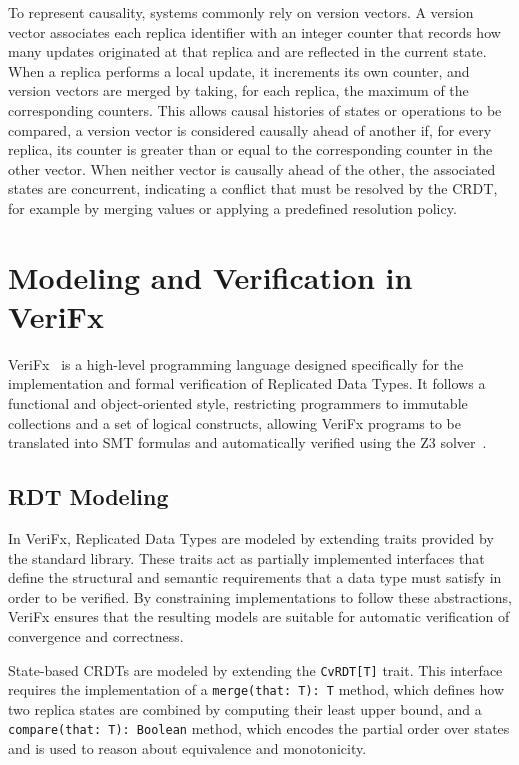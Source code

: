 To represent causality, systems commonly rely on version vectors. A version vector associates each replica identifier with an integer counter that records how many updates originated at that replica and are reflected in the current state. When a replica performs a local update, it increments its own counter, and version vectors are merged by taking, for each replica, the maximum of the corresponding counters. This allows causal histories of states or operations to be compared, a version vector is considered causally ahead of another if, for every replica, its counter is greater than or equal to the corresponding counter in the other vector. When neither vector is causally ahead of the other, the associated states are concurrent, indicating a conflict that must be resolved by the CRDT, for example by merging values or applying a predefined resolution policy.

\section{Modeling and Verification in VeriFx}
\label{sec:verifx}

VeriFx~\cite{porre2023masses} is a high-level programming language designed specifically for the implementation and formal verification of Replicated Data Types. It follows a functional and object-oriented style, restricting programmers to immutable collections and a set of logical constructs, allowing VeriFx programs to be translated into SMT formulas and automatically verified using the Z3 solver~\cite{z3}.

\subsection{RDT Modeling}
\label{sub:modeling}

In VeriFx, Replicated Data Types are modeled by extending traits provided by the standard library. These traits act as partially implemented interfaces that define the structural and semantic requirements that a data type must satisfy in order to be verified. By constraining implementations to follow these abstractions, VeriFx ensures that the resulting models are suitable for automatic verification of convergence and correctness.

State-based CRDTs are modeled by extending the \texttt{CvRDT[T]} trait. This interface requires the implementation of a \texttt{merge(that: T): T} method, which defines how two replica states are combined by computing their least upper bound, and a \texttt{compare(that: T): Boolean} method, which encodes the partial order over states and is used to reason about equivalence and monotonicity.

